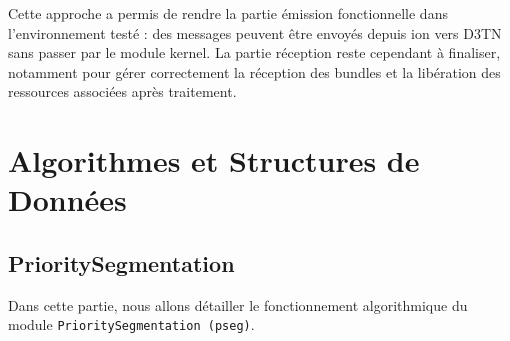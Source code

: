 \documentclass{article}
\begin{document}
Cette approche a permis de rendre la partie émission fonctionnelle dans l’environnement testé : des messages peuvent être envoyés depuis \gls{ion} vers \textmu D3TN sans passer par le module kernel. La partie réception reste cependant à finaliser, notamment pour gérer correctement la réception des bundles et la libération des ressources associées après traitement.


\newpage
\section{Algorithmes et Structures de Données}
\subsection{PrioritySegmentation}
Dans cette partie, nous allons détailler le fonctionnement algorithmique du module \texttt{PrioritySegmentation (pseg)}.
\end{document}
